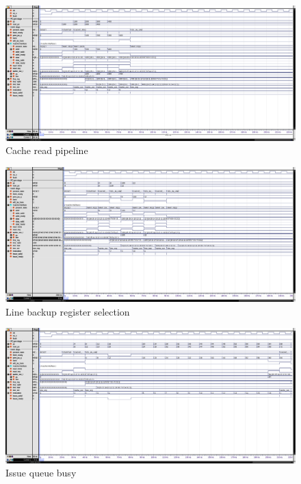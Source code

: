 \begin{figure}
  \centering
  \includegraphics[width=\textheight]{img/fetch07_conv.png}
  \caption{Cache read pipeline}
  \label{fig:fetch07_conv}
\end{figure}
\begin{figure}
  \centering
  \includegraphics[width=\textheight]{img/fetch09_conv.png}
  \caption{Line backup register selection}
  \label{fig:fetch09_conv}
\end{figure}
\begin{figure}
  \centering
  \includegraphics[width=\textheight]{img/fetch03_conv.png}
  \caption{Issue queue busy}
  \label{fig:fetch03_conv}
\end{figure}

